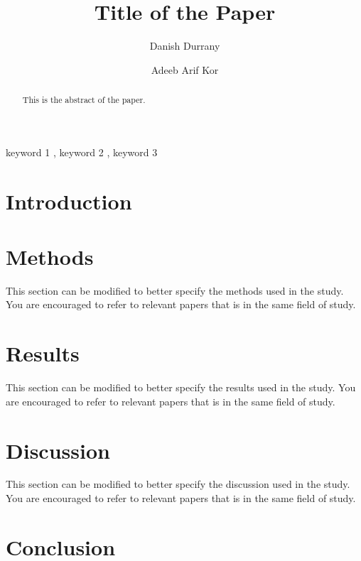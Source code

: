 \documentclass[preprint,3p,number]{elsarticle}
\begin{document}
\begin{frontmatter}
\title{Title of the Paper}

\author[inst2]{Danish Durrany}

\author[inst1]{Adeeb Arif Kor}

\begin{abstract}
    This is the abstract of the paper.
\end{abstract}

\begin{keyword}
    keyword 1 \sep
    keyword 2 \sep
    keyword 3
\end{keyword}

\end{frontmatter}

\section{Introduction}

\section{Methods}

This section can be modified to better specify the methods used in the study.
You are encouraged to refer to relevant papers that is in the same field of
study.

\section{Results}

This section can be modified to better specify the results used in the study.
You are encouraged to refer to relevant papers that is in the same field of
study.

\section{Discussion}

This section can be modified to better specify the discussion used in the study.
You are encouraged to refer to relevant papers that is in the same field of
study.

\section{Conclusion}
\end{document}
